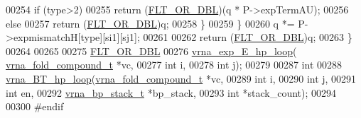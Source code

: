 \begin{DoxyCode}
00254       \textcolor{keywordflow}{if} (type>2)
00255         \textcolor{keywordflow}{return} (\hyperlink{group__data__structures_ga31125aeace516926bf7f251f759b6126}{FLT\_OR\_DBL})(q * P->expTermAU);
00256       \textcolor{keywordflow}{else}
00257         \textcolor{keywordflow}{return} (\hyperlink{group__data__structures_ga31125aeace516926bf7f251f759b6126}{FLT\_OR\_DBL})q;
00258     \}
00259   \}
00260   q *= P->expmismatchH[type][si1][sj1];
00261 
00262   \textcolor{keywordflow}{return} (\hyperlink{group__data__structures_ga31125aeace516926bf7f251f759b6126}{FLT\_OR\_DBL})q;
00263 \}
00264 
00265 
00275 \hyperlink{group__data__structures_ga31125aeace516926bf7f251f759b6126}{FLT\_OR\_DBL}
00276 \hyperlink{group__loops_gac9f49b31d3ec1d9040798b05506c71da}{vrna\_exp\_E\_hp\_loop}( \hyperlink{group__fold__compound_structvrna__fc__s}{vrna\_fold\_compound\_t} *vc,
00277                     \textcolor{keywordtype}{int} i,
00278                     \textcolor{keywordtype}{int} j);
00279 
00287 \textcolor{keywordtype}{int}
00288 \hyperlink{group__loops_ga6c4ba14d24f716d0ca9021771357e903}{vrna\_BT\_hp\_loop}(\hyperlink{group__fold__compound_structvrna__fc__s}{vrna\_fold\_compound\_t} *vc,
00289                 \textcolor{keywordtype}{int} i,
00290                 \textcolor{keywordtype}{int} j,
00291                 \textcolor{keywordtype}{int} en,
00292                 \hyperlink{group__data__structures_structvrna__bp__stack__s}{vrna\_bp\_stack\_t} *bp\_stack,
00293                 \textcolor{keywordtype}{int}   *stack\_count);
00294 
00300 \textcolor{preprocessor}{#endif}
\end{DoxyCode}
